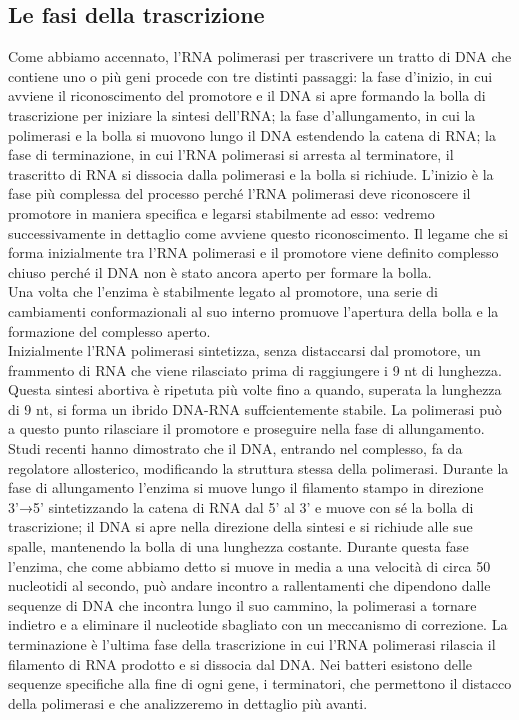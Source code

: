 \documentclass{article}
\begin{document}
\subsection{Le fasi della trascrizione}
Come abbiamo accennato, l'RNA polimerasi per trascrivere un tratto di DNA
che contiene uno o più geni procede con tre distinti passaggi: la fase
d'inizio, in cui avviene il riconoscimento del promotore e il DNA si apre formando la bolla di trascrizione per iniziare la sintesi dell'RNA; la fase d'allungamento, in cui la polimerasi e la bolla si muovono lungo il DNA estendendo
la catena di RNA; la fase di terminazione, in cui l'RNA polimerasi si arresta al
terminatore, il trascritto di RNA si dissocia dalla polimerasi e la bolla si richiude.
L'inizio è la fase più complessa del processo perché l'RNA polimerasi deve riconoscere il promotore in maniera specifica e legarsi stabilmente ad esso: vedremo
successivamente in dettaglio come avviene questo riconoscimento. Il legame che si
forma inizialmente tra l'RNA polimerasi e il promotore viene definito complesso
chiuso perché il DNA non è stato ancora aperto per formare la bolla.\\
Una volta che l'enzima è stabilmente legato al promotore, una serie di cambiamenti conformazionali al suo interno promuove l'apertura della bolla e la formazione
del complesso aperto.\\
Inizialmente l'RNA polimerasi sintetizza, senza distaccarsi dal
promotore, un frammento di RNA che viene rilasciato prima di raggiungere i 9 nt
di lunghezza. Questa sintesi abortiva è ripetuta più volte fino a quando, superata
la lunghezza di 9 nt, si forma un ibrido DNA-RNA suffcientemente stabile. La
polimerasi può a questo punto rilasciare il promotore e proseguire nella fase di allungamento. Studi recenti hanno dimostrato che il DNA, entrando nel complesso,
fa da regolatore allosterico, modificando la struttura stessa della polimerasi.
Durante la fase di allungamento l'enzima si muove lungo il filamento stampo in
direzione 3'→5' sintetizzando la catena di RNA dal 5' al 3' e muove con sé la bolla
di trascrizione; il DNA si apre nella direzione della sintesi e si richiude alle sue spalle, mantenendo la bolla di una lunghezza costante. Durante questa fase l'enzima,
che come abbiamo detto si muove in media a una velocità di circa 50 nucleotidi
al secondo, può andare incontro a rallentamenti che dipendono dalle sequenze di
DNA che incontra lungo il suo cammino,  la polimerasi a tornare indietro
e a eliminare il nucleotide sbagliato con un meccanismo di correzione.
La terminazione è l'ultima fase della trascrizione in cui l'RNA polimerasi rilascia il filamento di RNA prodotto e si dissocia dal DNA. Nei batteri esistono
delle sequenze specifiche alla fine di ogni gene, i terminatori, che permettono il
distacco della polimerasi e che analizzeremo in dettaglio più avanti.
\end{document}
